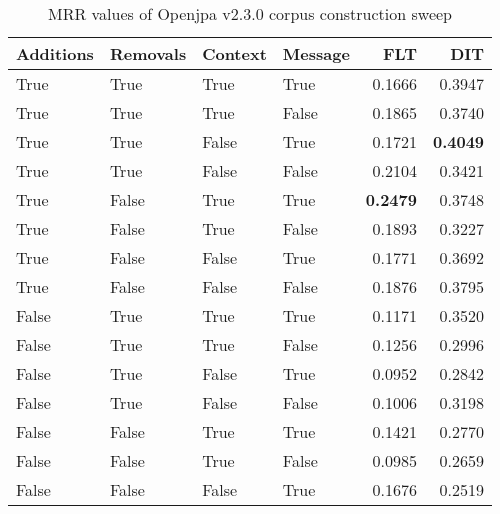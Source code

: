
\begin{table}
\begin{spacing}{1.2}
\centering
\caption{MRR values of Openjpa v2.3.0 corpus construction sweep}
\label{table:openjpa_corpus_sweep}
\vspace{0.2em}
\begin{tabular}{llll|rr}
\toprule
Additions & Removals & Context & Message & FLT &       DIT \\
\midrule
     True &     True &    True &    True &           0.1666 &       0.3947 \\
     True &     True &    True &   False &           0.1865 &       0.3740 \\
     True &     True &   False &    True &           0.1721 & {\bf 0.4049} \\
     True &     True &   False &   False &           0.2104 &       0.3421 \\
     True &    False &    True &    True &     {\bf 0.2479} &       0.3748 \\
     True &    False &    True &   False &           0.1893 &       0.3227 \\
     True &    False &   False &    True &           0.1771 &       0.3692 \\
     True &    False &   False &   False &           0.1876 &       0.3795 \\
    False &     True &    True &    True &           0.1171 &       0.3520 \\
    False &     True &    True &   False &           0.1256 &       0.2996 \\
    False &     True &   False &    True &           0.0952 &       0.2842 \\
    False &     True &   False &   False &           0.1006 &       0.3198 \\
    False &    False &    True &    True &           0.1421 &       0.2770 \\
    False &    False &    True &   False &           0.0985 &       0.2659 \\
    False &    False &   False &    True &           0.1676 &       0.2519 \\
\bottomrule
\end{tabular}

\end{spacing}
\end{table}

